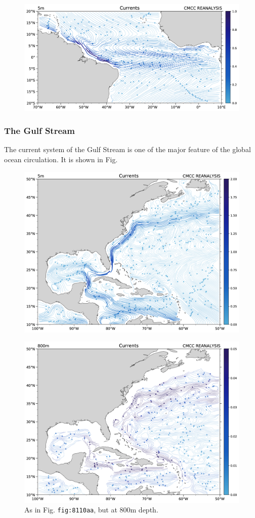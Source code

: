 \begin{figure}
	\centering
	\includegraphics[width = .7 \textwidth]{figs/GD/UVstream5mATLEQ.png}
	\caption{} \label{fig:}
\end{figure}

\subsubsection{The Gulf Stream}\label{the-gulf-stream}

The current system of the Gulf Stream is one of the major feature of the
global ocean circulation. It is shown in Fig.

\begin{figure}
	\centering
	\includegraphics[width = .7 \textwidth]{figs/GD/UVstream5mATLCARIB.png}
	\caption{} \label{fig:}
\end{figure}

\begin{figure}
	\centering
	\includegraphics[width = .7 \textwidth]{figs/GD/UVstream800mATLCARIB.png}
	\caption{As in Fig. \texttt{fig:8110aa}, but at 800m depth.}
\end{figure}

